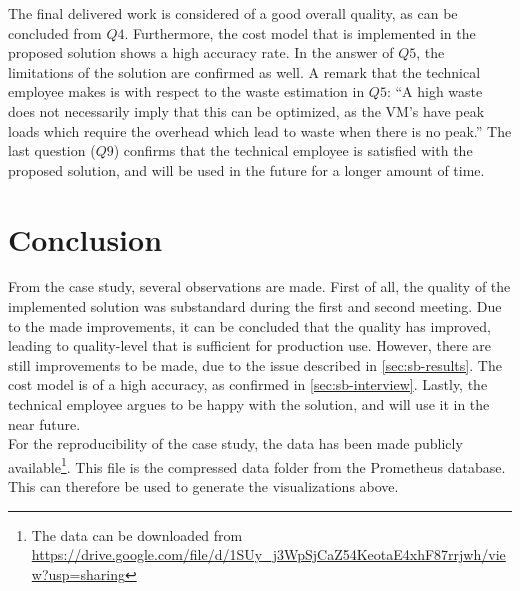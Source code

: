 \noindent
The final delivered work is considered of a good overall quality, as can be concluded from $Q4$. Furthermore, the cost model that is implemented in the proposed solution shows a high accuracy rate. In the answer of $Q5$, the limitations of the solution are confirmed as well. A remark that the technical employee makes is with respect to the waste estimation in $Q5$: ``A high waste does not necessarily imply that this can be optimized, as the VM's have peak loads which require the overhead which lead to waste when there is no peak.'' The last question ($Q9$) confirms that the technical employee is satisfied with the proposed solution, and will be used in the future for a longer amount of time.

\section{Conclusion} \label{sec:sb-evaluation}
From the case study, several observations are made. First of all, the quality of the implemented solution was substandard during the first and second meeting. Due to the made improvements, it can be concluded that the quality has improved, leading to quality-level that is sufficient for production use. However, there are still improvements to be made, due to the issue described in \autoref{sec:sb-results}. The cost model is of a high accuracy, as confirmed in \autoref{sec:sb-interview}. Lastly, the technical employee argues to be happy with the solution, and will use it in the near future.\\

\noindent
For the reproducibility of the case study, the data has been made publicly available\footnote{The data can be downloaded from \url{https://drive.google.com/file/d/1SUy_j3WpSjCaZ54KeotaE4xhF87rrjwh/view?usp=sharing}}. This file is the compressed data folder from the Prometheus database. This can therefore be used to generate the visualizations above.